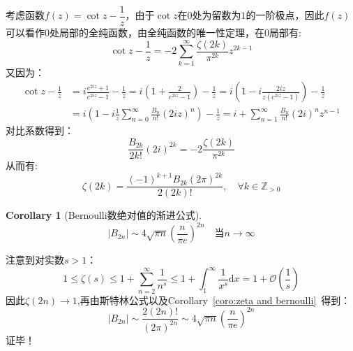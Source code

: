\documentclass[a4paper,12pt]{ctexart}
\newenvironment{prooff}{{\noindent\it\textcolor{cyan!40!black}{Proof}:}\quad}{\par}
\newtheorem{coro}[defn]{Corollary}
\newcommand{\bb}[1]{\mathbb{#1}}
\begin{document}
\begin{prooff}
    考虑函数$f(z)=\cot z-\dfrac{1}{z}$，由于$\cot z$在$0$处为留数为$1$的一阶极点，因此$f(z)$可以看作$0$处局部的全纯函数，由全纯函数的唯一性定理，在$0$局部有:
    \begin{equation*}
        \cot z -\frac{1}{z}=-2\sum_{k=1}^{\infty}\frac{\zeta (2k)}{\pi ^{2k}}z^{2k-1}
    \end{equation*}
    又因为：
    \begin{align*}
        \cot z -\frac{1}{z} & =i\frac{e^{2iz}+1}{e^{2iz}-1}-\frac{1}{z}=i(1+\frac{2}{e^{2iz}-1})-\frac{1}{z}
        =i(1-i\frac{2iz}{z(e^{2iz}-1)})-\frac{1}{z}                                                          \\
                            & =i(1-i\frac{1}{z}\sum_{n=0}^{\infty}\frac{B_n}{n!}(2iz)^n)-\frac{1}{z}
        =i+\sum_{n=1}^{\infty}\frac{B_{n}}{n!}(2i)^{n}z^{n-1}
    \end{align*}
    对比系数得到：
    \begin{equation*}
        \frac{B_{2k}}{2k!}(2i)^{2k}=-2\frac{\zeta(2k)}{\pi^{2k}}
    \end{equation*}
    从而有:
    \begin{equation*}
        \zeta(2k)=\frac{(-1)^{k+1}B_{2k}(2\pi)^{2k}}{2(2k)!},\quad \forall k\in \bb{Z}_{>0}
    \end{equation*}
\end{prooff}
\begin{coro}[Bernoulli数绝对值的渐进公式]
    \begin{equation*}
        |B_{2n}|\sim 4\sqrt{\pi n}(\frac{n}{\pi e})^{2n}  \quad  \text{当} n\to \infty
    \end{equation*}
\end{coro}
\begin{prooff}
    注意到对实数$s>1$：
    \begin{equation*}
        1\le \zeta(s)\le 1+\sum_{n=2}^{\infty}\frac{1}{n^s}\le 1+\int_{1}^{\infty}\frac{1}{x^s}\text{d}x=1+\mathcal{O}(\frac{1}{s})
    \end{equation*}
    因此$\zeta(2n)\to 1$,再由斯特林公式以及Corollary~\ref{coro:zeta and bernoulli}~得到：
    \begin{equation*}
        |B_{2n}|\sim \frac{2(2n)!}{(2\pi)^{2n}}\sim 4\sqrt{\pi n}(\frac{n}{\pi e})^{2n}
    \end{equation*}
    证毕！
\end{prooff}
\end{document}
